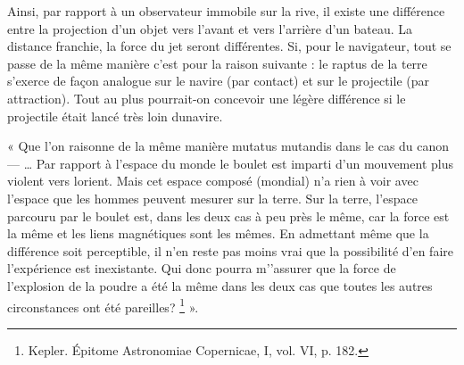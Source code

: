 Ainsi, par rapport à un observateur immobile sur la rive, il existe une
différence entre la projection d’un objet vers l’avant et vers l’arrière
d’un bateau. La distance franchie, la force du jet seront différentes. Si,
pour le navigateur, tout se passe de la même manière c’est pour la raison
suivante : le raptus de la terre s’exerce de façon analogue sur le navire
(par contact) et sur le projectile (par attraction). Tout au plus pourrait-on
concevoir une légère différence si le projectile était lancé très loin dunavire.

« Que l’on raisonne de la même manière mutatus mutandis dans le
cas du canon — … Par rapport à l’espace du monde le boulet est imparti
d’un mouvement plus violent vers lorient. Mais cet espace composé
(mondial) n’a rien à voir avec l’espace que les hommes peuvent mesurer
sur la terre. Sur la terre, l’espace parcouru par le boulet est, dans les deux
cas à peu près le même, car la force est la même et les liens magnétiques
sont les mêmes. En admettant même que la différence soit perceptible,
il n’en reste pas moins vrai que la possibilité d’en faire l’expérience est
inexistante. Qui donc pourra m'’assurer que la force de l’explosion de la
poudre a été la même dans les deux cas que toutes les autres circonstances
ont été pareilles? \footnote{Kepler. Épitome Astronomiae Copernicae, I, vol. VI, p. 182.} ».

